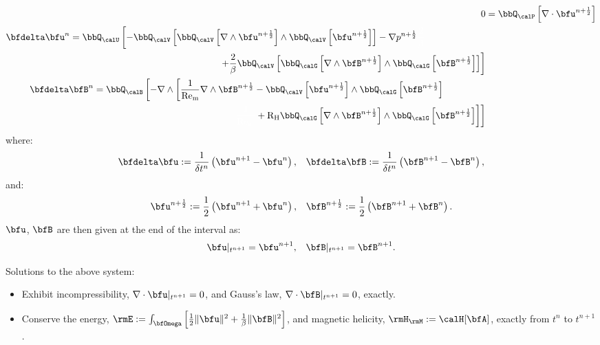     \begin{align}
                           0  &=  \bbQ_{\calP}\left[\nabla\cdot\bfu^{n + \frac{1}{2}}\right]  \\
        \begin{split}
            \bfdelta\bfu^{n}  &=  \bbQ_{\calU}\left[- \bbQ_{\calV}\left[\bbQ_{\calV}\left[\nabla\wedge\bfu^{n + \frac{1}{2}}\right]\wedge\bbQ_{\calV}\left[\bfu^{n + \frac{1}{2}}\right]\right] - \nabla p^{n + \frac{1}{2}}{\color{white} \frac{2}{\beta}}\right.  \\
            &\qquad\qquad\qquad\qquad\qquad\qquad\qquad\qquad\left.+ \frac{2}{\beta}\bbQ_{\calV}\left[\bbQ_{\calG}\left[\nabla\wedge\bfB^{n + \frac{1}{2}}\right]\wedge\bbQ_{\calG}\left[\bfB^{n + \frac{1}{2}}\right]\right]\right]
        \end{split}  \\
        \begin{split}
            \bfdelta\bfB^{n}  &=  \bbQ_{\calB}\left[- \nabla\wedge\left[\frac{1}{\rmRem}\nabla\wedge\bfB^{n + \frac{1}{2}} - \bbQ_{\calV}\left[\bfu^{n + \frac{1}{2}}\right]\wedge\bbQ_{\calG}\left[\bfB^{n + \frac{1}{2}}\right]\right.\right.  \\
            &\qquad\qquad\qquad\qquad\qquad\qquad\qquad\;\;\;\left.\left.{\color{white} \frac{1}{\rmRem}}+ \rmRH\bbQ_{\calG}\left[\nabla\wedge\bfB^{n + \frac{1}{2}}\right]\wedge\bbQ_{\calG}\left[\bfB^{n + \frac{1}{2}}\right]\right]\right]
        \end{split}
    \end{align}
    where:
    \begin{align}
        \bfdelta\bfu  :=  \frac{1}{\delta t^{n}}\left(\bfu^{n + 1} - \bfu^{n}\right),  &&
        \bfdelta\bfB  :=  \frac{1}{\delta t^{n}}\left(\bfB^{n + 1} - \bfB^{n}\right),
    \end{align}
    and:
    \begin{align}
        \bfu^{n + \frac{1}{2}}  :=  \frac{1}{2}\left(\bfu^{n + 1} + \bfu^{n}\right),  &&
        \bfB^{n + \frac{1}{2}}  :=  \frac{1}{2}\left(\bfB^{n + 1} + \bfB^{n}\right).
    \end{align}
    $\bfu$, $\bfB$ are then given at the end of the interval as:
    \begin{align}
        \bfu|_{t^{n + 1}} = \bfu^{n + 1},  &&
        \bfB|_{t^{n + 1}} = \bfB^{n + 1}.
    \end{align}
    
    \shortline

    Solutions to the above system:
    \begin{itemize}
        \item  Exhibit incompressibility, $\nabla\cdot\bfu|_{t^{n + 1}}  =  0$, and Gauss's law, $\nabla\cdot\bfB|_{t^{n + 1}}  =  0$, exactly.
        \item  Conserve the energy, $\rmE  :=  \int_{\bfOmega}\left[\frac{1}{2}\|\bfu\|^{2} + \frac{1}{\beta}\|\bfB\|^{2}\right]$, and magnetic helicity, $\rmH_{\rmM}  :=  \calH[\bfA]$, exactly from $t^{n}$ to $t^{n + 1}$.
    \end{itemize}

